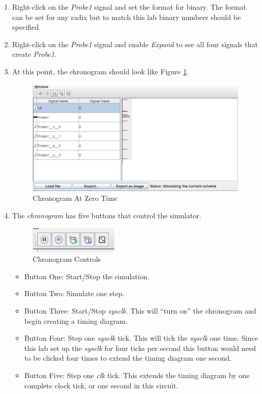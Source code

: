 \begin{enumerate}
	\item Right-click on the \textit{Probe1} signal and set the format for binary. The format can be set for any radix but to match this lab binary numbers should be specified.
	\item Right-click on the \textit{Probe1} signal and enable \textit{Expand} to see all four signals that create \textit{Probe1}.
	\item At this point, the chronogram should look like Figure \ref{fig:06-11}.
	
	\begin{figure}[H]
		\centering
		\includegraphics[width=\maxwidth{.95\linewidth}]{gfx/06-11}
		\caption{Chronogram At Zero Time}
		\label{fig:06-11}
	\end{figure}
	
	\item The \textit{chronogram} has five buttons that control the simulator.
	
	\begin{figure}[H]
		\centering
		\includegraphics[width=\maxwidth{.95\linewidth}]{gfx/06-12}
		\caption{Chronogram Controls}
		\label{fig:06-12}
	\end{figure}
	
	\begin{itemize}
		\item Button One: Start/Stop the simulation.
		\item Button Two: Simulate one step.
		\item Button Three: Start/Stop \textit{sysclk}. This will ``turn on'' the chronogram and begin creating a timing diagram.
		\item Button Four: Step one \textit{sysclk} tick. This will tick the \textit{sysclk} one time. Since this lab set up the \textit{sysclk} for four ticks per second this button would need to be clicked four times to extend the timing diagram one second.
		\item Button Five: Step one \textit{clk} tick. This extends the timing diagram by one complete clock tick, or one second in this circuit.
	\end{itemize}
	

\end{enumerate}
